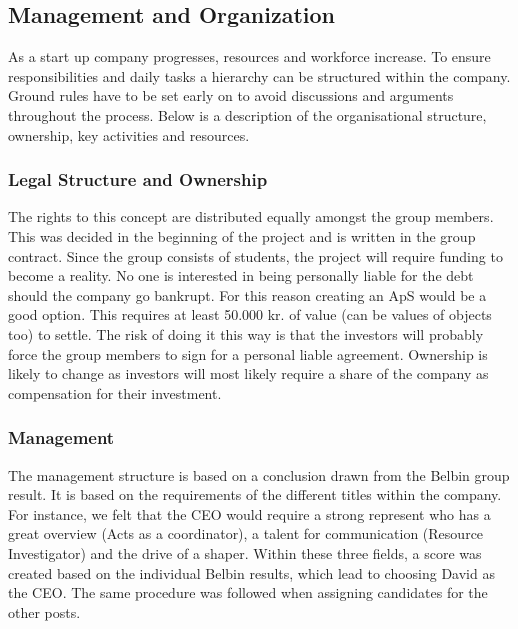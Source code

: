 \subsection{Management and Organization}
As a start up company progresses, resources and workforce increase. To ensure responsibilities and daily tasks a hierarchy can be structured within the company. Ground rules have to be set early on to avoid discussions and arguments throughout the process. Below is a description of the organisational structure, ownership, key activities and resources.

\subsubsection{Legal Structure and Ownership}
The rights to this concept are distributed equally amongst the group members. 
This was decided in the beginning of the project and is written in the group contract.
Since the group consists of students, the project will require funding to become a reality. No one is interested in being personally liable for the debt should the company go bankrupt. 
For this reason creating an ApS would be a good option. 
This requires at least 50.000 kr. of value (can be values of objects too) to settle. The risk of doing it this way is that the investors will probably force the group members to sign for a personal liable agreement. 
Ownership is likely to change as investors will most likely require a share of the company as compensation for their investment.

\subsubsection{Management}
The management structure is based on a conclusion drawn from the Belbin group result. It is based on the requirements of the different titles within the company. For instance, we felt that the CEO would require a strong represent who has a great overview (Acts as a coordinator), a talent for communication (Resource Investigator) and the drive of a shaper. Within these three fields, a score was created based on the individual Belbin results, which lead to choosing David as the CEO. 
The same procedure was followed when assigning candidates for the other posts. 

